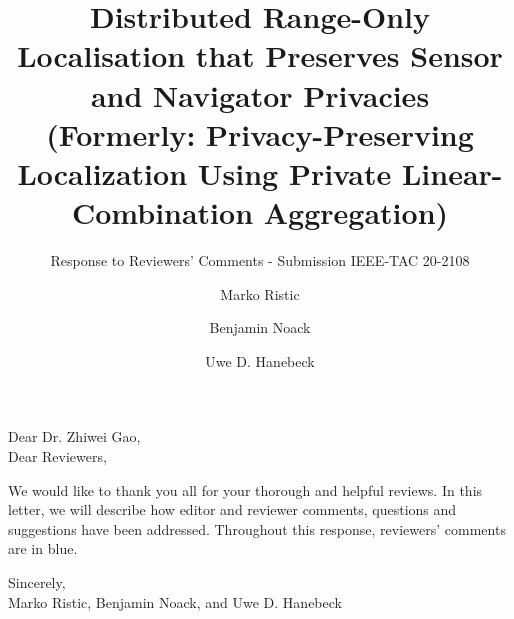 \documentclass[a4paper]{scrartcl}
\title{\boldmath Distributed Range-Only Localisation that Preserves Sensor and Navigator Privacies\\\normalfont(Formerly: Privacy-Preserving Localization Using Private Linear-Combination Aggregation)}
\subtitle{Response to Reviewers' Comments - Submission IEEE-TAC 20-2108}
\author{Marko Ristic\and Benjamin Noack\and Uwe D. Hanebeck}
\newcommand{\reviewtext}[1]{{\color{nblue} #1}}
\begin{document}
\maketitle

Dear Dr. Zhiwei Gao,\\
Dear Reviewers,

We would like to thank you all for your thorough and helpful reviews. In this letter, we will describe how editor and reviewer comments, questions and suggestions have been addressed. Throughout this response, reviewers' comments are in \reviewtext{blue}. 

Sincerely,\\
Marko Ristic, Benjamin Noack, and Uwe D. Hanebeck

\end{document}
